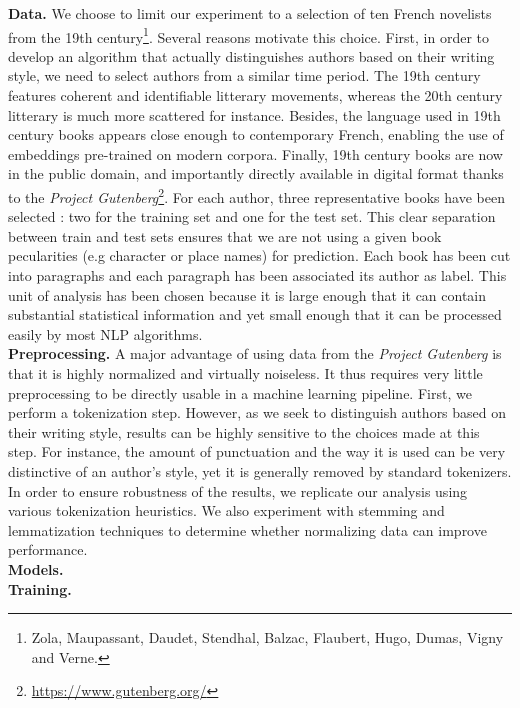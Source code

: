 \documentclass[11pt,a4paper]{article}
\begin{document}
\textbf{Data.} We choose to limit our experiment to a selection of ten French novelists from the 19th century\footnote{Zola, Maupassant, Daudet, Stendhal, Balzac, Flaubert, Hugo, Dumas, Vigny and Verne.}. Several reasons motivate this choice. First, in order to develop an algorithm that actually distinguishes authors based on their writing style, we need to select authors from a similar time period. The 19th century features coherent and identifiable litterary movements, whereas the 20th century litterary is much more scattered for instance. Besides, the language used in 19th century books appears close enough to contemporary French, enabling the use of embeddings pre-trained on modern corpora. Finally, 19th century books are now in the public domain, and importantly directly available in digital format thanks to the \textit{Project Gutenberg}\footnote{\url{https://www.gutenberg.org/}}. For each author, three representative books have been selected : two for the training set and one for the test set. This clear separation between train and test sets ensures that we are not using a given book pecularities (e.g character or place names) for prediction. Each book has been cut into paragraphs and each paragraph has been associated its author as label. This unit of analysis has been chosen because it is large enough that it can contain substantial statistical information and yet small enough that it can be processed easily by most NLP algorithms. \\

\textbf{Preprocessing.} A major advantage of using data from the \textit{Project Gutenberg} is that it is highly normalized and virtually noiseless. It thus requires very little preprocessing to be directly usable in a machine learning pipeline. First, we perform a tokenization step. However, as we seek to distinguish authors based on their writing style, results can be highly sensitive to the choices made at this step. For instance, the amount of punctuation and the way it is used can be very distinctive of an author's style, yet it is generally removed by standard tokenizers. In order to ensure robustness of the results, we replicate our analysis using various tokenization heuristics. We also experiment with stemming and lemmatization techniques to determine whether normalizing data can improve performance. \\

\textbf{Models.}  \\

\textbf{Training.}  \\
\end{document}
